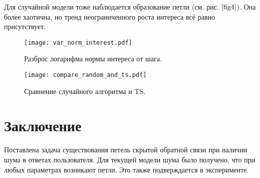 \documentclass[12pt, twoside]{article}
\begin{document}
Для случайной модели тоже наблюдается образование петли (см. рис.$~\ref{fig4}$). 
Она более хаотична, но тренд неограниченного роста интереса всё равно присутствует.   

\begin{figure}[h]
  \begin{multicols}{2}
    \hfill
    \texttt{[image: var\_norm\_interest.pdf]}
    \hfill
    \caption{Разброс логарифма нормы интереса от шага.}
    \label{fig3}
    \hfill
    \texttt{[image: compare\_random\_and\_ts.pdf]}
    \hfill
    \caption{Сравнение случайного алгоритма и TS.}
    \label{fig4}
  \end{multicols}
\end{figure}




\newpage

\section{Заключение}
Поставлена задача существования петель скрытой обратной связи при наличии шума в ответах пользователя. 
Для текущей модели шума было получено, что при любых параметрах возникают петли. 
Это также подверждается в эксперименте.
\end{document}
